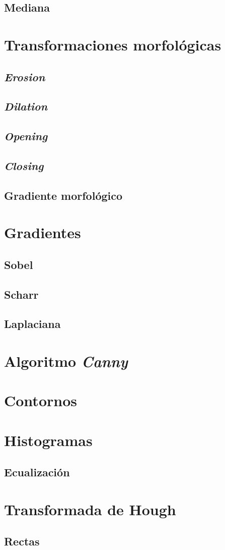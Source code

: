 \subsection{Mediana}

\section{Transformaciones morfológicas}
\subsection{\emph{Erosion}}
\subsection{\emph{Dilation}}
\subsection{\emph{Opening}}
\subsection{\emph{Closing}}
\subsection{Gradiente morfológico}

\section{Gradientes}
\subsection{Sobel}
\subsection{Scharr}
\subsection{Laplaciana}

\section{Algoritmo \emph{Canny}}

\section{Contornos}

\section{Histogramas}
\subsection{Ecualización}

\section{Transformada de Hough}
\subsection{Rectas}